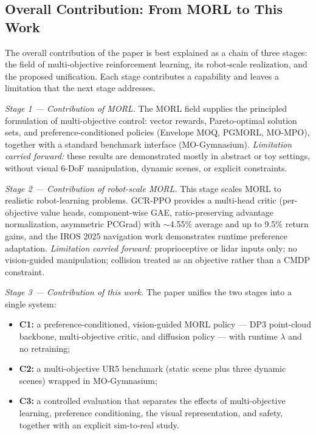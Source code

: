 \documentclass[11pt,a4paper]{article}
\begin{document}
\subsection{Overall Contribution: From MORL to This Work}

The overall contribution of the paper is best explained as a chain of
three stages: the field of multi-objective reinforcement learning, its
robot-scale realization, and the proposed unification. Each stage
contributes a capability and leaves a limitation that the next stage
addresses.

\emph{Stage 1 --- Contribution of MORL.}
The MORL field supplies the principled formulation of multi-objective
control: vector rewards, Pareto-optimal solution sets, and
preference-conditioned policies (Envelope MOQ, PGMORL, MO-MPO), together
with a standard benchmark interface (MO-Gymnasium).
\textit{Limitation carried forward:} these results are demonstrated
mostly in abstract or toy settings, without visual 6-DoF manipulation,
dynamic scenes, or explicit constraints.

\emph{Stage 2 --- Contribution of robot-scale MORL.}
This stage scales MORL to realistic robot-learning problems. GCR-PPO
provides a multi-head critic (per-objective value heads, component-wise
GAE, ratio-preserving advantage normalization, asymmetric PCGrad) with
$\sim$4.55\% average and up to 9.5\% return gains, and the IROS 2025
navigation work demonstrates runtime preference adaptation.
\textit{Limitation carried forward:} proprioceptive or lidar inputs only;
no vision-guided manipulation; collision treated as an objective rather
than a CMDP constraint.

\emph{Stage 3 --- Contribution of this work.}
The paper unifies the two stages into a single system:
\begin{itemize}
  \item \textbf{C1:} a preference-conditioned, vision-guided MORL policy
  --- DP3 point-cloud backbone, multi-objective critic, and diffusion
  policy --- with runtime $\lambda$ and no retraining;
  \item \textbf{C2:} a multi-objective UR5 benchmark (static scene plus
  three dynamic scenes) wrapped in MO-Gymnasium;
  \item \textbf{C3:} a controlled evaluation that separates the effects
  of multi-objective learning, preference conditioning, the visual
  representation, and safety, together with an explicit sim-to-real study.
\end{itemize}
\end{document}
